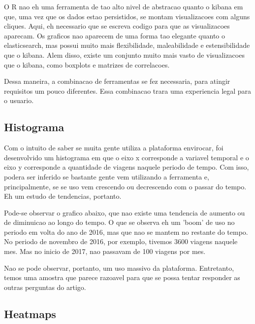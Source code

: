 \documentclass[10pt, conference]{IEEEtran}
\begin{document}
O R nao eh uma ferramenta de tao alto nivel de abstracao quanto o kibana em que, uma vez
que os dados estao persistidos, se montam visualizacoes com alguns cliques. Aqui, eh necessario
que se escreva codigo para que as visualizacoes aparecam. Os graficos nao aparecem de uma
forma tao elegante quanto o elasticsearch, mas possui muito mais flexibilidade, maleabilidade
e estensibilidade que o kibana. Alem disso, existe um conjunto muito mais vasto de visualizacoes
que o kibana, como boxplots e matrizes de correlacoes.

Dessa maneira, a combinacao de ferramentas se fez necessaria, para atingir requisitos um pouco
diferentes. Essa combinacao trara uma experiencia legal para o usuario.

\subsection{Histograma}

Com o intuito de saber se muita gente utiliza a plataforma envirocar, foi desenvolvido
um histograma em que o eixo x corresponde a variavel temporal e o eixo y corresponde
a quantidade de viagens naquele periodo de tempo. Com isso, podera ser inferido se bastante
gente vem utilizando a ferramenta e, principalmente, se se uso vem crescendo ou decrescendo
com o passar do tempo. Eh um estudo de tendencias, portanto.

Pode-se observar o grafico abaixo, que nao existe uma tendencia de aumento ou de diminuicao
ao longo do tempo. O que se observa eh um 'boom' de uso no periodo em volta do ano de 2016,
mas que nao se mantem no restante do tempo. No periodo de novembro de 2016, por exemplo, 
tivemos 3600 viagens naquele mes. Mas no inicio de 2017, nao passavam de 100 viagens por mes.

Nao se pode observar, portanto, um uso massivo da plataforma. Entretanto, temos uma amostra
que parece razoavel para que se possa tentar responder as outras perguntas do artigo.



\subsection{Heatmaps}
\end{document}
